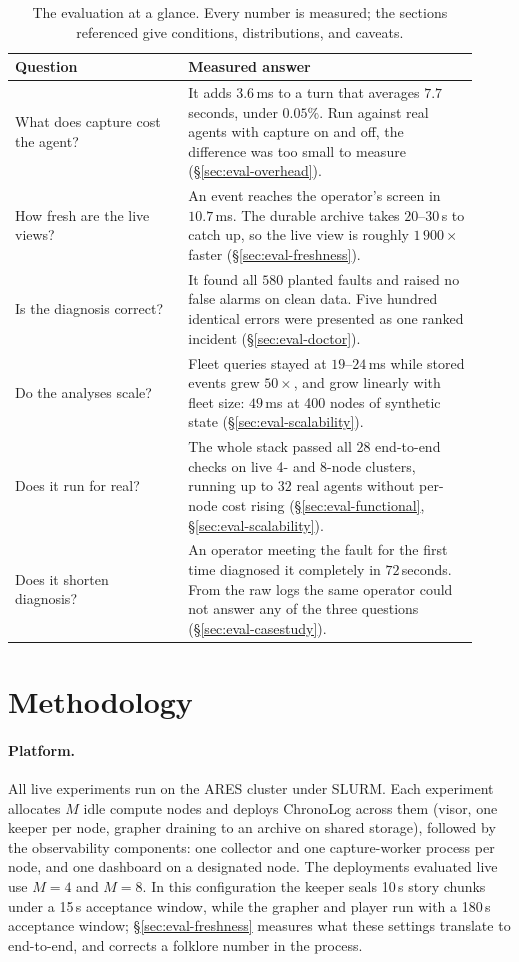 \begin{table}[t]
\centering
\small
\begin{tabular}{@{}p{0.34\linewidth}p{0.58\linewidth}@{}}
\toprule
\textbf{Question} & \textbf{Measured answer} \\
\midrule
What does capture cost the agent? &
  It adds $3.6$\,ms to a turn that averages $7.7$\,seconds, under
  $0.05\%$. Run against real agents with capture on and off, the
  difference was too small to measure (\S\ref{sec:eval-overhead}). \\
How fresh are the live views? &
  An event reaches the operator's screen in $10.7$\,ms. The durable
  archive takes $20$--$30$\,s to catch up, so the live view is roughly
  $1\,900\times$ faster (\S\ref{sec:eval-freshness}). \\
Is the diagnosis correct? &
  It found all $580$ planted faults and raised no false alarms on clean
  data. Five hundred identical errors were presented as one ranked
  incident (\S\ref{sec:eval-doctor}). \\
Do the analyses scale? &
  Fleet queries stayed at $19$--$24$\,ms while stored events grew
  $50\times$, and grow linearly with fleet size: $49$\,ms at 400 nodes
  of synthetic state (\S\ref{sec:eval-scalability}). \\
Does it run for real? &
  The whole stack passed all $28$ end-to-end checks on live 4- and
  8-node clusters, running up to $32$ real agents without per-node cost
  rising (\S\ref{sec:eval-functional}, \S\ref{sec:eval-scalability}). \\
Does it shorten diagnosis? &
  An operator meeting the fault for the first time diagnosed it
  completely in $72$\,seconds. From the raw logs the same operator could
  not answer any of the three questions (\S\ref{sec:eval-casestudy}). \\
\bottomrule
\end{tabular}
\caption[The evaluation at a glance]{The evaluation at a glance. Every number is measured; the
sections referenced give conditions, distributions, and caveats.}
\label{tab:eval-glance}
\end{table}

\section{Methodology}
\label{sec:eval-method}

\paragraph{Platform.} All live experiments run on the ARES cluster under
SLURM. Each experiment allocates $M$ idle compute nodes and deploys
ChronoLog across them (visor, one keeper per node, grapher draining to
an archive on shared storage), followed by the observability components:
one collector and one capture-worker process per node, and one dashboard
on a designated node. The deployments evaluated live use $M = 4$ and
$M = 8$. In this configuration the keeper seals 10\,s story chunks under a
15\,s acceptance window, while the grapher and player run with a
180\,s acceptance window; \S\ref{sec:eval-freshness} measures what these
settings translate to end-to-end, and corrects a folklore number in the
process.


